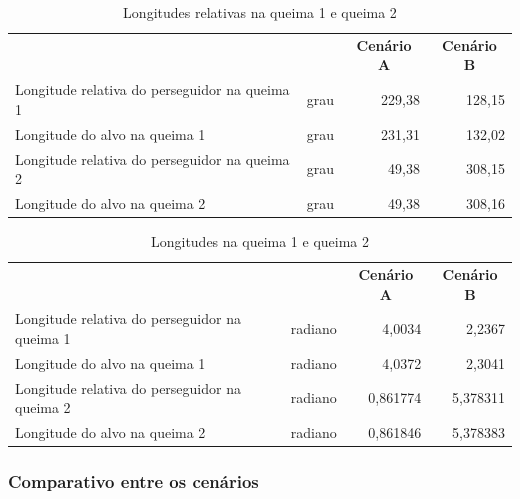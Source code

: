 \begin{table}[H]
\centering
\caption{Longitudes relativas na queima 1 e queima 2}
\begin{tabularx}{\linewidth}{|>{\raggedright\arraybackslash}X|
                             >{\raggedright\arraybackslash}c|
                             r|r|}
\hline
\multicolumn{1}{|c|}{\textbf{Variável}} &
\multicolumn{1}{c|}{\textbf{Unidade}} &
\multicolumn{1}{c|}{\textbf{Cenário A}} &
\multicolumn{1}{c|}{\textbf{Cenário B}} \\
\hhline{|=|=|=|=|}
Longitude relativa do perseguidor na queima 1 & grau & 229,38 & 128,15 \\
\hline
Longitude do alvo na queima 1        & grau & 231,31 & 132,02 \\
\hline
Longitude relativa do perseguidor na queima 2 & grau & 49,38  & 308,15 \\
\hline
Longitude do alvo na queima 2        & grau & 49,38  & 308,16 \\
\hline
\end{tabularx}
\label{tab:cap4_longitudes_queimas}
\end{table}

\begin{table}[H]
\centering
\caption{Longitudes na queima 1 e queima 2}
\begin{tabularx}{\linewidth}{|>{\raggedright\arraybackslash}X|
                             >{\raggedright\arraybackslash}c|
                             r|r|}
\hline
\multicolumn{1}{|c|}{\textbf{Variável}} &
\multicolumn{1}{c|}{\textbf{Unidade}} &
\multicolumn{1}{c|}{\textbf{Cenário A}} &
\multicolumn{1}{c|}{\textbf{Cenário B}} \\
\hhline{|=|=|=|=|}
Longitude relativa do perseguidor na queima 1 & radiano & 4,0034   & 2,2367   \\
\hline
Longitude do alvo na queima 1        & radiano & 4,0372   & 2,3041   \\
\hline
Longitude relativa do perseguidor na queima 2 & radiano & 0,861774 & 5,378311 \\
\hline
Longitude do alvo na queima 2        & radiano & 0,861846 & 5,378383 \\
\hline
\end{tabularx}
\label{tab:cap4_longitudes_queimas_rad}
\end{table}

\subsubsection{Comparativo entre os cenários}

